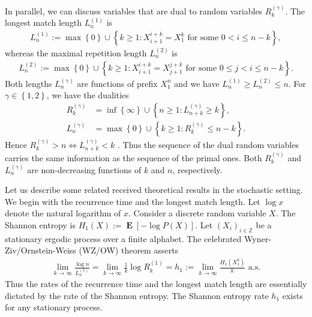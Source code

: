 \documentclass[a4paper,12pt]{article}
\newcommand{\kwad}[1]{\left[ #1 \right]}
\newcommand{\klam}[1]{\left\{ #1 \right\}}
\DeclareMathOperator{\mean}{\mathbf{E}}
\begin{document}
In parallel, we can discuss variables that are dual to random
variables $R^{(\gamma)}_k$. The longest match length $L^{(1)}_n$ is
\begin{align}
  L^{(1)}_n:=\max\klam{0}\cup\klam{k\ge 1: X_{i+1}^{i+k}=X_1^k
  \text{ for some } 0< i\le n-k},
\end{align}
whereas the maximal repetition length $L^{(2)}_n$ is
\begin{align}
  L^{(2)}_n:=\max\klam{0}\cup\klam{k\ge 1: X_{i+1}^{i+k}=X_{j+1}^{j+k}
  \text{ for some } 0\le j< i\le n-k}.
\end{align}
Both lengths $L^{(\gamma)}_n$ are functions of prefix $X_1^n$ and we have
$L^{(1)}_n\ge L^{(2)}_n\le n$. For $\gamma\in\klam{1,2}$, we have the
dualities
\begin{align}
  \label{DualityOne}
  R^{(\gamma)}_k&=\inf\klam{\infty}\cup\klam{n\ge 1: L^{(\gamma)}_{n+k}\ge k},
  \\
  \label{DualityTwo}
  L^{(\gamma)}_n&=\max\klam{0}\cup\klam{k\ge 1: R^{(\gamma)}_k\le n-k}.
\end{align}
Hence $R^{(\gamma)}_k>n\iff L^{(\gamma)}_{n+k}<k$
\citep{WynerZiv89}. Thus the sequence of the dual random variables
carries the same information as the sequence of the primal ones. Both
$R^{(\gamma)}_k$ and $L^{(\gamma)}_n$ are non-decreasing functions of
$k$ and $n$, respectively.

Let us describe some related received theoretical results in the
stochastic setting. We begin with the recurrence time and the longest
match length.  Let $\log x$ denote the natural logarithm of $x$.
Consider a discrete random variable $X$. The Shannon entropy is
$H_1(X):=\mean\kwad{-\log P(X)}$. Let $(X_i)_{i\in\mathbb{Z}}$ be a
stationary ergodic process over a finite alphabet. The celebrated
Wyner-Ziv/Ornstein-Weiss (WZ/OW) theorem
\citep{WynerZiv89,OrnsteinWeiss93} asserts
\begin{align}
  \label{WZOW}
  \lim_{k\to\infty} \frac{\log n}{L^{(1)}_n}
  =\lim_{k\to\infty} \frac{1}{k}\log R^{(1)}_k
  =h_1:=\lim_{k\to\infty} \frac{H_1(X_1^k)}{k}
  \text{ a.s.}
\end{align}
Thus the rates of the recurrence time and the longest match length are
essentially dictated by the rate of the Shannon entropy.  The Shannon
entropy rate $h_1$ exists for any stationary process.
\end{document}
